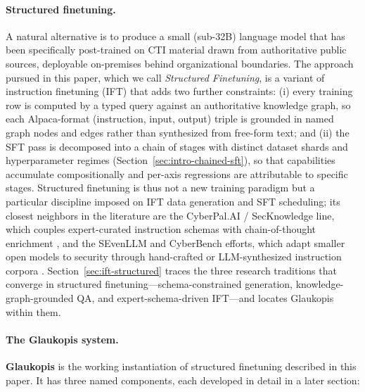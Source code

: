 \documentclass[unnumsec,webpdf,contemporary,large]{oup-authoring-template}
\theoremstyle{thmstyleone}
\theoremstyle{thmstyletwo}
\theoremstyle{thmstylethree}
\begin{document}
\paragraph{Structured finetuning.}
A natural alternative is to produce a small (sub-32B) language model that has been specifically post-trained on CTI material drawn from authoritative public sources, deployable on-premises behind organizational boundaries. The approach pursued in this paper, which we call \textit{Structured Finetuning}, is a variant of instruction finetuning (IFT) \cite{wei2022flan,ouyang2022instructgpt,chung2022flant5} that adds two further constraints: (i) every training row is computed by a typed query against an authoritative knowledge graph, so each Alpaca-format (instruction, input, output) triple is grounded in named graph nodes and edges rather than synthesized from free-form text; and (ii) the SFT pass is decomposed into a chain of stages with distinct dataset shards and hyperparameter regimes (Section~\ref{sec:intro-chained-sft}), so that capabilities accumulate compositionally and per-axis regressions are attributable to specific stages. Structured finetuning is thus not a new training paradigm but a particular discipline imposed on IFT data generation and SFT scheduling; its closest neighbors in the literature are the CyberPal.AI / SecKnowledge line, which couples expert-curated instruction schemas with chain-of-thought enrichment \cite{levi2024cyberpal,levi2025toward}, and the SEvenLLM and CyberBench efforts, which adapt smaller open models to security through hand-crafted or LLM-synthesized instruction corpora \cite{ji2024sevenllm,liu2024cyberbench}. Section~\ref{sec:ift-structured} traces the three research traditions that converge in structured finetuning---schema-constrained generation, knowledge-graph-grounded QA, and expert-schema-driven IFT---and locates Glaukopis within them.

\paragraph{The Glaukopis system.}
\textbf{Glaukopis} is the working instantiation of structured finetuning described in this paper. It has three named components, each developed in detail in a later section:
\end{document}

